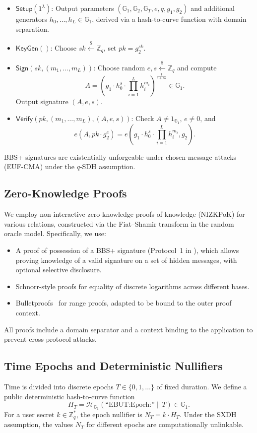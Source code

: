 \documentclass[11pt]{article}
\theoremstyle{definitionstyle}
\theoremstyle{plain}
\begin{document}
\begin{itemize}
\item $\mathsf{Setup}(1^\lambda)$: Output parameters $(\mathbb{G}_1,\mathbb{G}_2,\mathbb{G}_T,e,q,g_1,g_2)$ and additional generators $h_0,\dots,h_L \in \mathbb{G}_1$, derived via a hash-to-curve function with domain separation.
\item $\mathsf{KeyGen}()$: Choose $sk \xleftarrow{\$} \mathbb{Z}_q$, set $pk = g_2^{sk}$.
\item $\mathsf{Sign}(sk, (m_1,\dots,m_L))$: Choose random $e, s \xleftarrow{\$} \mathbb{Z}_q$ and compute
  \[
  A = \left( g_1 \cdot h_0^s \cdot \prod_{i=1}^L h_i^{m_i} \right)^{\frac{1}{e+sk}} \in \mathbb{G}_1.
  \]
  Output signature $(A,e,s)$.
\item $\mathsf{Verify}(pk, (m_1,\dots,m_L), (A,e,s))$: Check $A \neq 1_{\mathbb{G}_1}$, $e \neq 0$, and
  \[
  e(A, pk \cdot g_2^e) = e\left( g_1 \cdot h_0^s \cdot \prod_{i=1}^L h_i^{m_i}, g_2 \right).
  \]
\end{itemize}
BBS+ signatures are existentially unforgeable under chosen-message attacks (EUF-CMA) under the $q$-SDH assumption.

\subsection{Zero-Knowledge Proofs}
We employ non-interactive zero-knowledge proofs of knowledge (NIZKPoK) for various relations, constructed via the Fiat--Shamir transform in the random oracle model. Specifically, we use:
\begin{itemize}
\item A proof of possession of a BBS+ signature (Protocol~1 in \cite{act}), which allows proving knowledge of a valid signature on a set of hidden messages, with optional selective disclosure.
\item Schnorr-style proofs for equality of discrete logarithms across different bases.
\item Bulletproofs~\cite{Bulletproofs} for range proofs, adapted to be bound to the outer proof context.
\end{itemize}
All proofs include a domain separator and a context binding to the application to prevent cross-protocol attacks.

\subsection{Time Epochs and Deterministic Nullifiers}
Time is divided into discrete epochs $T \in \{0,1,\dots\}$ of fixed duration. We define a public deterministic hash-to-curve function
\[
H_T = \mathcal{H}_{\mathbb{G}_1}(\text{``EBUT:Epoch:''} \parallel T) \in \mathbb{G}_1.
\]
For a user secret $k \in \mathbb{Z}_q^*$, the epoch nullifier is $N_T = k \cdot H_T$. Under the SXDH assumption, the values $N_T$ for different epochs are computationally unlinkable.
\end{document}
